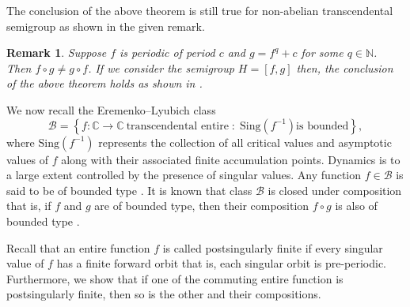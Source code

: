 \documentclass[a4paper,12pt]{amsart}
\newcommand{\C}{\mathbb{C}}
\newcommand{\N}{\mathbb{N}}
\numberwithin{equation}{section}
\newtheorem{theorem}{Theorem}[section]
\newtheorem{remark}[theorem]{Remark}
\newtheorem{definition}[theorem]{Definition}
\begin{document}
The conclusion of the above theorem is still true for non-abelian transcendental semigroup as shown in the given remark.
	\begin{remark}
		Suppose $f$ is periodic of period $c$ and $g=f^q+c$ for some $ q\in \mathbb{N}$. Then $f \circ g \neq g \circ f $. If we consider the semigroup $H=[f,g]$ then, the conclusion of the above theorem holds as shown in \cite{kumar2016dynamics}.
	\end{remark}

We now recall the Eremenko--Lyubich class
	\[
	\mathcal{B}
	=
	\left\{
	f : \mathbb{C} \to \mathbb{C} \ \text{transcendental entire}
	\; : \;
	\mathrm{Sing}(f^{-1})  \text{is bounded}
	\right\},
	\]
	where $\mathrm{Sing}(f^{-1})$ represents the collection of all critical values and asymptotic  values of $f$ along with their associated finite accumulation points. Dynamics is to a large extent controlled by the presence of singular values. Any function $f \in \mathcal{B}$ is said to be of
	bounded type . It is known that class $\mathcal{B}$ is closed
	under composition that is, if $f$ and $g$ are of bounded type, then their composition $f \circ g$ is also of bounded type  \cite{bergweiler1998dynamics}.

Recall that an entire function $f$ is called postsingularly finite if every singular value of $f$ has a finite forward orbit that is, each singular orbit is pre-periodic. Furthermore, we show that if one of the commuting entire function is postsingularly finite, then so is the other and their compositions.
	
\end{document}
